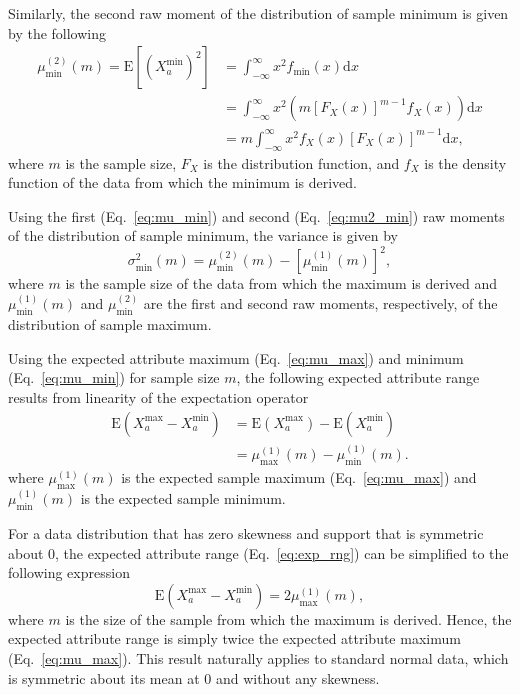 \documentclass[aoas]{imsart}
\begin{document}
Similarly, the second raw moment of the distribution of sample minimum is given by the following
%
\begin{equation}\label{eq:mu2_min}
\begin{aligned}
\mu^{(2)}_\text{min}(m) = \text{E}[(X^\text{min}_a)^2] &= \int_{-\infty}^{\infty}x^2 f_\text{min}(x)\text{d}x \\
&= \int_{-\infty}^{\infty}x^2 \left(m [F_X(x)]^{m-1} f_X(x)\right)\text{d}x \\
&= m \int_{-\infty}^{\infty}x^2 f_X(x) [F_X(x)]^{m-1}\text{d}x,
\end{aligned}
\end{equation}
%
where $m$ is the sample size, $F_X$ is the distribution function, and $f_X$ is the density function of the data from which the minimum is derived.

Using the first (Eq.~\ref{eq:mu_min}) and second (Eq.~\ref{eq:mu2_min}) raw moments of the distribution of sample minimum, the variance is given by
%
\begin{equation}\label{eq:sig_min}
\sigma^2_\text{min}(m) = \mu^{(2)}_\text{min}(m) - \left[\mu^{(1)}_\text{min}(m)\right]^2,
\end{equation}
%
where $m$ is the sample size of the data from which the maximum is derived and $\mu^{(1)}_\text{min}(m)$ and $\mu^{(2)}_\text{min}$ are the first and second raw moments, respectively, of the distribution of sample maximum.

Using the expected attribute maximum (Eq.~\ref{eq:mu_max}) and minimum (Eq.~\ref{eq:mu_min}) for sample size $m$, the following expected attribute range results from linearity of the expectation operator
%
\begin{equation}\label{eq:exp_rng}
\begin{aligned}
\text{E}(X^\text{max}_a - X^\text{min}_a) &= \text{E}(X^\text{max}_a) - \text{E}(X^\text{min}_a) \\
&= \mu^{(1)}_\text{max}(m) - \mu^{(1)}_\text{min}(m).
\end{aligned}
\end{equation}
%
where $\mu^{(1)}_\text{max}(m)$ is the expected sample maximum (Eq.~\ref{eq:mu_max}) and $\mu^{(1)}_\text{min}(m)$ is the expected sample minimum.

For a data distribution that has zero skewness and support that is symmetric about 0, the expected attribute range (Eq.~\ref{eq:exp_rng}) can be simplified to the following expression
%
\begin{equation}\label{eq:exp_rng_symm}
\text{E}(X^\text{max}_a - X^\text{min}_a) = 2 \mu^{(1)}_\text{max}(m),
\end{equation}
%
where $m$ is the size of the sample from which the maximum is derived. Hence, the expected attribute range is simply twice the expected attribute maximum (Eq.~\ref{eq:mu_max}). This result naturally applies to standard normal data, which is symmetric about its mean at 0 and without any skewness.  
\end{document}

